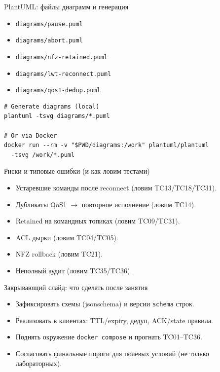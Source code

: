\documentclass[aspectratio=169]{beamer}
\begin{document}
\begin{frame}[fragile]{PlantUML: файлы диаграмм и генерация}
\begin{itemize}
  \item \texttt{diagrams/pause.puml}
  \item \texttt{diagrams/abort.puml}
  \item \texttt{diagrams/nfz-retained.puml}
  \item \texttt{diagrams/lwt-reconnect.puml}
  \item \texttt{diagrams/qos1-dedup.puml}
\end{itemize}
\vspace{0.7em}
\small
\begin{verbatim}
# Generate diagrams (local)
plantuml -tsvg diagrams/*.puml

# Or via Docker
docker run --rm -v "$PWD/diagrams:/work" plantuml/plantuml
  -tsvg /work/*.puml
\end{verbatim}
\end{frame}

\begin{frame}[fragile]{Риски и типовые ошибки (и как ловим тестами)}
\begin{itemize}
  \item Устаревшие команды после reconnect (ловим TC13/TC18/TC31).
  \item Дубликаты QoS1 $\rightarrow$ повторное исполнение (ловим TC14).
  \item Retained на командных топиках (ловим TC09/TC31).
  \item ACL дырки (ловим TC04/TC05).
  \item NFZ rollback (ловим TC21).
  \item Неполный аудит (ловим TC35/TC36).
\end{itemize}
\end{frame}

\begin{frame}[fragile]{Закрывающий слайд: что сделать после занятия}
\begin{itemize}
  \item Зафиксировать схемы (jsonschema) и версии \texttt{schema} строк.
  \item Реализовать в клиентах: TTL/expiry, дедуп, ACK/state правила.
  \item Поднять окружение \texttt{docker compose} и прогнать TC01--TC36.
  \item Согласовать финальные пороги для полевых условий (не только лабораторных).
\end{itemize}
\end{frame}
\end{document}
